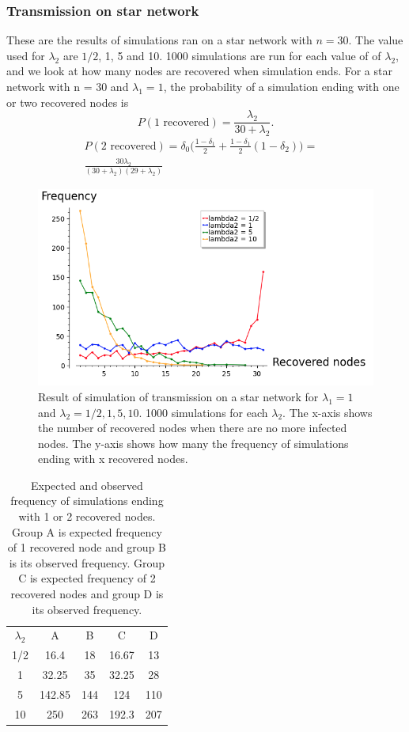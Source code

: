 \documentclass[12pt]{article} %
\numberwithin{equation}{section}
\begin{document}
\subsubsection{Transmission on star network}\label{simsirstarsec}
These are the results of simulations ran on a star network with $n=30$. The value used for $\lambda_2$ are $1/2$, 1, 5 and 10. 1000 simulations are run for each value of of $\lambda_2$, and we look at how many nodes are recovered when simulation ends. For a star network with n = 30 and $\lambda_1 = 1$, the probability of a simulation ending with one or two recovered nodes is
\begin{equation}\label{bara1star}
    P(\text{1 recovered}) = \frac{\lambda_2}{30+\lambda_2}.
\end{equation}
\begin{align}\label{bara2star}
    P(\text{2 recovered}) = \delta_0\Big(\frac{1-\delta_1}{2}+\frac{1-\delta_1}{2}(1-\delta_2)\Big) = & \\ \frac{30\lambda_2}{(30+\lambda_2){(29+\lambda_2)}}
\end{align}
\begin{figure}[H]
    \centering
    \includegraphics[scale=0.7]{starSIR.png}   
    \caption{Result of simulation of transmission on a star network for $\lambda_1 = 1$ and $\lambda_2 = 1/2,1,5,10$. 1000 simulations for each $\lambda_2$. The x-axis shows the number of recovered nodes when there are no more infected nodes. The y-axis shows how many the frequency of simulations ending with x recovered nodes.}
    \label{starsirplot}
\end{figure}
\begin{table}
    \centering
   \begin{tabular}{c|c|c|c|c}
     $\lambda_2$&  A& B& C&D\\
     1/2& 16.4& 18&16.67&13 \\
     1& 32.25&35&32.25&28 \\
     5& 142.85&144 &124&110  \\
     10& 250& 263 &192.3&207 \\
\end{tabular} 
    \label{tablestarsir}
    \caption{Expected and observed frequency of simulations ending with 1 or 2 recovered nodes. Group A is expected frequency of 1 recovered node and group B is its observed frequency. Group C is expected frequency of 2 recovered nodes and group D is its observed frequency.}
\end{table}
\end{document}
